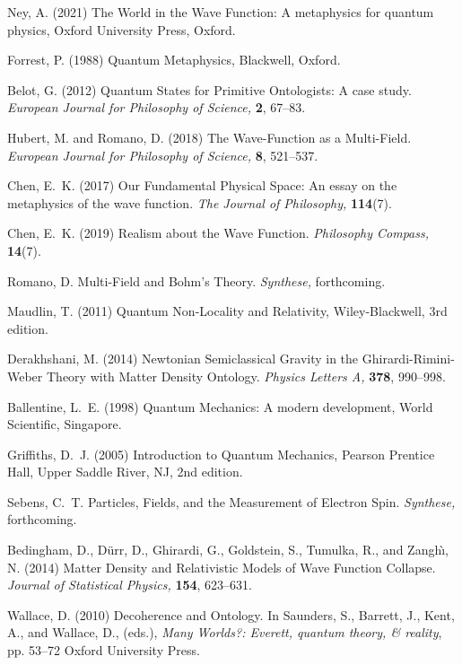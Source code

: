 \documentclass[onecolumn,secnumarabic,amsmath,amssymb,balancelastpage,nofootinbib]{article}
\begin{document}
\begin{thebibliography}{100}
Ney, A. (2021)
The World in the Wave Function: A metaphysics for quantum physics,
Oxford University Press, Oxford.

Forrest, P. (1988)
Quantum Metaphysics,
Blackwell, Oxford.

Belot, G. (2012)
Quantum States for Primitive Ontologists: A case study.
{\em European Journal for Philosophy of Science,} {\bf 2}, 67--83.

Hubert, M. and Romano, D. (2018)
The Wave-Function as a Multi-Field.
{\em European Journal for Philosophy of Science,} {\bf 8}, 521--537.

Chen, E.~K. (2017)
Our Fundamental Physical Space: An essay on the metaphysics of the wave
  function.
{\em The Journal of Philosophy,} {\bf 114}(7).

Chen, E.~K. (2019)
Realism about the Wave Function.
{\em Philosophy Compass,} {\bf 14}(7).

Romano, D.
Multi-Field and Bohm's Theory.
{\em Synthese,}
forthcoming.

Maudlin, T. (2011)
Quantum Non-Locality and Relativity,
Wiley-Blackwell,  3rd edition.

Derakhshani, M. (2014)
Newtonian Semiclassical Gravity in the Ghirardi-Rimini-Weber Theory with Matter
  Density Ontology.
{\em Physics Letters A,} {\bf 378}, 990--998.

Ballentine, L.~E. (1998)
Quantum Mechanics: A modern development,
World Scientific, Singapore.

Griffiths, D.~J. (2005)
Introduction to Quantum Mechanics,
Pearson Prentice Hall, Upper Saddle River, NJ, 2nd edition.

Sebens, C.~T.
Particles, Fields, and the Measurement of Electron Spin.
{\em Synthese,}
forthcoming.

Bedingham, D., D\"urr, D., Ghirardi, G., Goldstein, S., Tumulka, R., and
  Zangh\`{\i}, N. (2014)
Matter Density and Relativistic Models of Wave Function Collapse.
{\em Journal of Statistical Physics,} {\bf 154}, 623--631.

Wallace, D. (2010)
Decoherence and Ontology.
In Saunders, S., Barrett, J., Kent, A., and Wallace, D., (eds.), \emph{Many
  Worlds?: Everett, quantum theory, \& reality},  pp. 53--72 Oxford University
  Press.


\end{thebibliography}
\end{document}
